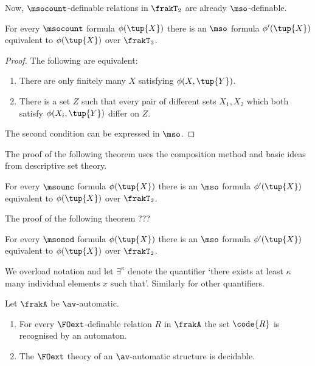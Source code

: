 Now, $\msocount$-definable relations in $\frakT_2$ are already $\mso$-definable.

\begin{proposition}
For every $\msocount$ formula $\phi(\tup{X})$ there is an $\mso$ formula 
$\phi'(\tup{X})$ equivalent to $\phi(\tup{X})$ over $\frakT_2$.
\end{proposition}

\begin{proof}
The following are equivalent:
\begin{enumerate}
\item There are only finitely many $X$ satisfying $\phi(X,\tup{Y})$. 
\item There is a set $Z$ such that every pair of different sets $X_1,X_2$ which both satisfy $\phi(X_i,\tup{Y})$ differ on $Z$.
\end{enumerate}
The second condition can be expressed in $\mso$.
\end{proof}

The proof of the following theorem uses the composition method and basic ideas from descriptive set theory.
\begin{theorem} \cite{BKRa}
For every $\msounc$ formula $\phi(\tup{X})$ there is an $\mso$ formula
$\phi'(\tup{X})$ equivalent to $\phi(\tup{X})$ over $\frakT_2$.
\end{theorem}

The proof of the following theorem ???
\begin{theorem} \cite{}
For every $\msomod$ formula $\phi(\tup{X})$ there is an $\mso$ formula
$\phi'(\tup{X})$ equivalent to $\phi(\tup{X})$ over $\frakT_2$.
\end{theorem}

We overload notation and let $\exists^\kappa$ denote the quantifier `there exists at least $\kappa$ many individual elements $x$ such that'.
Similarly for other quantifiers. 


\begin{theorem} \label{AS:thm:FOext}
Let $\frakA$ be $\av$-automatic.
\begin{enumerate}
\item For every $\FOext$-definable relation $R$ in $\frakA$ the set $\code{R}$ is recognised by an automaton.
\item The $\FOext$ theory of an $\av$-automatic structure is decidable.
\end{enumerate}
\end{theorem}

